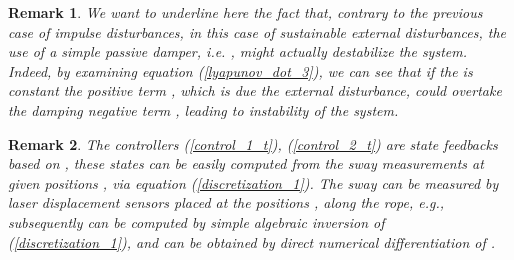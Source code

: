 \documentclass[letterpaper, 11 pt, conference]{ieeeconf}
\newtheorem{remark}{Remark}
\begin{document}
\begin{remark}
We want to underline here the fact that, contrary to the previous
case of impulse disturbances, in this case of sustainable external
disturbances, the use of a simple passive damper, i.e. ,
might actually destabilize the system. Indeed, by examining
equation (\ref{lyapunov_dot_3}), we can see that if the  is
constant the positive term , which is due
the external disturbance, could overtake the damping negative term
, leading to instability of the
system.
\end{remark}
\begin{remark}
The controllers (\ref{control_1_t}), (\ref{control_2_t}) are state
feedbacks based on , these states can be easily
computed from the sway measurements at  given positions
, via equation (\ref{discretization_1}). The sway
 can be measured by laser displacement sensors placed at
the positions , along the rope,
e.g.\cite{OYNFN02}, subsequently  can be computed by simple
algebraic inversion of (\ref{discretization_1}), and  can
be obtained by direct numerical differentiation of .
\end{remark}
\end{document}
